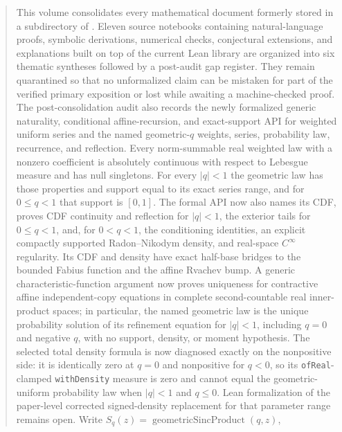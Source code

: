 \documentclass[11pt,oneside]{article}
\theoremstyle{definition}
\theoremstyle{remark}
\begin{document}
\maketitle

\begin{abstract}
This volume consolidates every mathematical document formerly stored in a subdirectory of
.  Eleven source
notebooks containing natural-language proofs, symbolic derivations, numerical checks,
conjectural extensions, and explanations built on top of the current Lean library are
organized into six thematic syntheses followed by a post-audit gap register.  They remain
quarantined so that no unformalized claim can be mistaken for part of the verified primary
exposition or lost while awaiting a machine-checked proof.
The post-consolidation audit also records the newly formalized generic naturality,
conditional affine-recursion, and exact-support API for weighted uniform series and the named
geometric-\(q\) weights, series, probability law, recurrence, and reflection.  Every
norm-summable real weighted law with a nonzero coefficient is absolutely continuous with
respect to Lebesgue measure and has null singletons.  For every \(|q|<1\) the geometric law
has those properties and support equal to its exact series range, and for \(0\le q<1\) that
support is \([0,1]\).  The formal API now also names its CDF, proves CDF continuity and
reflection for \(|q|<1\), the exterior tails for \(0\le q<1\), and, for \(0<q<1\), the
conditioning identities, an explicit compactly supported Radon--Nikodym density, and
real-space \(C^\infty\) regularity.  Its CDF and density have exact half-base bridges to the
bounded Fabius function and the affine Rvachev bump.  A generic characteristic-function
argument now proves uniqueness for contractive affine independent-copy equations in complete
second-countable real inner-product spaces; in particular, the named geometric law is the
unique probability solution of its refinement equation for \(|q|<1\), including \(q=0\)
and negative \(q\), with no support, density, or moment hypothesis.  The selected total
density formula is now diagnosed exactly on the nonpositive side: it is identically zero
at \(q=0\) and nonpositive for \(q<0\), so its \texttt{ofReal}-clamped
\texttt{withDensity} measure is zero and cannot equal the geometric-uniform probability law
when \(|q|<1\) and \(q\le0\).  Lean formalization of the paper-level corrected
signed-density replacement for that parameter range remains open.  Write
\(S_q(z)=\operatorname{geometricSincProduct}(q,z)\),

\end{abstract}
\end{document}
